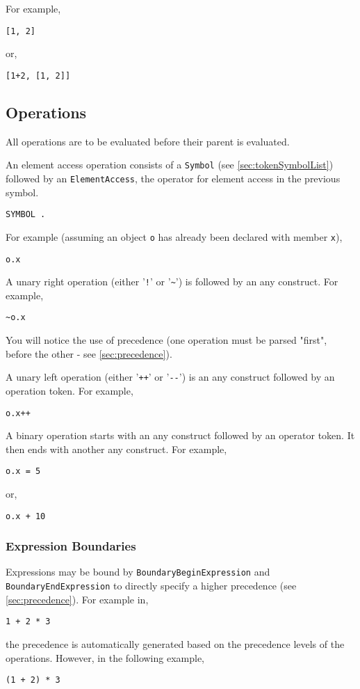 \documentclass[10pt,a4paper]{article}
\begin{document}
For example,
\begin{verbatim}
[1, 2]
\end{verbatim}

or,
\begin{verbatim}
[1+2, [1, 2]]
\end{verbatim}

\subsection{Operations}
\label{sec:operations}
All operations are to be evaluated before their parent is evaluated.

An element access operation consists of a \verb|Symbol| (see \ref{sec:tokenSymbolList}) followed by an \verb|ElementAccess|, the operator for element access in the previous symbol.
\begin{verbatim}
SYMBOL .
\end{verbatim}

For example (assuming an object \verb|o| has already been declared with member \verb|x|),
\begin{verbatim}
o.x
\end{verbatim}

A unary right operation (either '\verb|!|' or '\verb|~|') is followed by an any construct. For example,
\begin{verbatim}
~o.x
\end{verbatim}

You will notice the use of precedence (one operation must be parsed "first", before the other - see \ref{sec:precedence}).

A unary left operation (either '\verb|++|' or '\verb|--|') is an any construct followed by an operation token. For example,
\begin{verbatim}
o.x++
\end{verbatim}

A binary operation starts with an any construct followed by an operator token. It then ends with another any construct. For example,
\begin{verbatim}
o.x = 5
\end{verbatim}
or,
\begin{verbatim}
o.x + 10
\end{verbatim}

\subsubsection{Expression Boundaries}
Expressions may be bound by \verb|BoundaryBeginExpression| and \verb|BoundaryEndExpression| to directly specify a higher precedence (see \ref{sec:precedence}). For example in,
\begin{verbatim}
1 + 2 * 3
\end{verbatim}
the precedence is automatically generated based on the precedence levels of the operations. However, in the following example,
\begin{verbatim}
(1 + 2) * 3
\end{verbatim}
\end{document}
